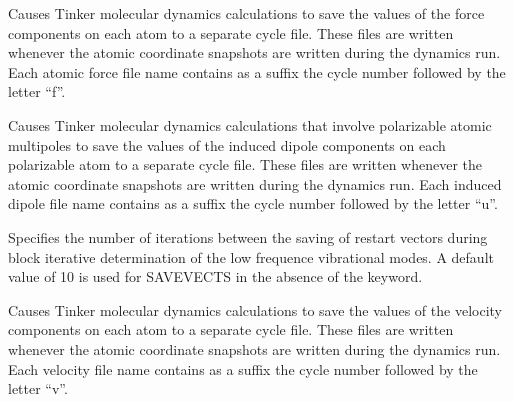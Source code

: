\documentclass[letterpaper,11pt,english]{sphinxmanual}
\begin{document}
\ignorespaces {}\label{\detokenize{text/keywords:key-save-force}}\begin{description}
\sphinxAtStartPar
Causes Tinker molecular dynamics calculations to save the values of the force components on each atom to a separate cycle file. These files are written whenever the atomic coordinate snapshots are written during the dynamics run. Each atomic force file name contains as a suffix the cycle number followed by the letter “f”.

\end{description}

\ignorespaces {}\label{\detokenize{text/keywords:key-save-induced}}\begin{description}
\sphinxAtStartPar
Causes Tinker molecular dynamics calculations that involve polarizable atomic multipoles to save the values of the induced dipole components on each polarizable atom to a separate cycle file. These files are written whenever the atomic coordinate snapshots are written during the dynamics run. Each induced dipole file name contains as a suffix the cycle number followed by the letter “u”.

\end{description}

\ignorespaces {}\label{\detokenize{text/keywords:key-save-vects}}\begin{description}
\sphinxAtStartPar
Specifies the number of iterations between the saving of restart vectors during block iterative determination of the low frequence vibrational modes. A default value of 10 is used for SAVE\sphinxhyphen{}VECTS in the absence of the keyword.

\end{description}

\ignorespaces {}\label{\detokenize{text/keywords:key-save-velocity}}\begin{description}
\sphinxAtStartPar
Causes Tinker molecular dynamics calculations to save the values of the velocity components on each atom to a separate cycle file. These files are written whenever the atomic coordinate snapshots are written during the dynamics run. Each velocity file name contains as a suffix the cycle number followed by the letter “v”.

\end{description}
\end{document}
